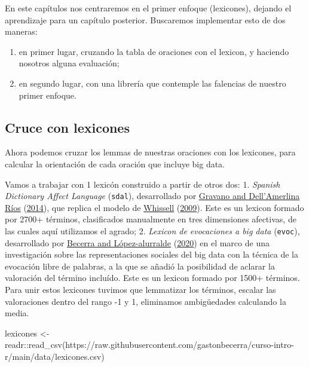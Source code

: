 \documentclass[
]{book}
\newenvironment{Shaded}{\begin{snugshade}}{\end{snugshade}}
\newcommand{\FunctionTok}[1]{\textcolor[rgb]{0.00,0.00,0.00}{#1}}
\newcommand{\NormalTok}[1]{#1}
\newcommand{\OtherTok}[1]{\textcolor[rgb]{0.56,0.35,0.01}{#1}}
\newcommand{\SpecialCharTok}[1]{\textcolor[rgb]{0.00,0.00,0.00}{#1}}
\newcommand{\StringTok}[1]{\textcolor[rgb]{0.31,0.60,0.02}{#1}}
\providecommand{\tightlist}{%
  \setlength{\itemsep}{0pt}\setlength{\parskip}{0pt}}
\begin{document}
En este capítulos nos centraremos en el primer enfoque (lexicones), dejando el aprendizaje para un capítulo posterior.
Buscaremos implementar esto de dos maneras:

\begin{enumerate}
\def\labelenumi{\arabic{enumi}.}
\tightlist
\item
  en primer lugar, cruzando la tabla de oraciones con el lexicon, y haciendo nosotros alguna evaluación;
\item
  en segundo lugar, con una librería que contemple las falencias de nuestro primer enfoque.
\end{enumerate}

\hypertarget{cruce-con-lexicones}{%
\subsection{Cruce con lexicones}\label{cruce-con-lexicones}}

Ahora podemos cruzar los lemmas de nuestras oraciones con los lexicones, para calcular la orientación de cada oración que incluye big data.

Vamos a trabajar con 1 lexicón construido a partir de otros dos: 1. \emph{Spanish Dictionary Affect Language} (\texttt{sdal}), desarrollado por \protect\hyperlink{ref-Gravano2014}{Gravano and Dell'Amerlina Ríos} (\protect\hyperlink{ref-Gravano2014}{2014}), que replica el modelo de \protect\hyperlink{ref-Whissell2009}{Whissell} (\protect\hyperlink{ref-Whissell2009}{2009}). Este es un lexicon formado por 2700+ términos, clasificados manualmente en tres dimensiones afectivas, de las cuales aquí utilizamos el agrado; 2. \emph{Lexicon de evocaciones a big data} (\texttt{evoc}), desarrollado por \protect\hyperlink{ref-Becerra2020}{Becerra and López-alurralde} (\protect\hyperlink{ref-Becerra2020}{2020}) en el marco de una investigación sobre las representaciones sociales del big data con la técnica de la evocación libre de palabras, a la que se añadió la posibilidad de aclarar la valoración del término incluído. Este es un lexicon formado por 1500+ términos. Para unir estos lexicones tuvimos que lemmatizar los términos, escalar las valoraciones dentro del rango -1 y 1, eliminamos ambigüedades calculando la media.

\begin{Shaded}
\begin{Highlighting}[]
\NormalTok{lexicones }\OtherTok{\textless{}{-}}\NormalTok{ readr}\SpecialCharTok{::}\FunctionTok{read\_csv}\NormalTok{(}\StringTok{\textquotesingle{}https://raw.githubusercontent.com/gastonbecerra/curso{-}intro{-}r/main/data/lexicones.csv\textquotesingle{}}\NormalTok{)}
\end{Highlighting}
\end{Shaded}
\end{document}
